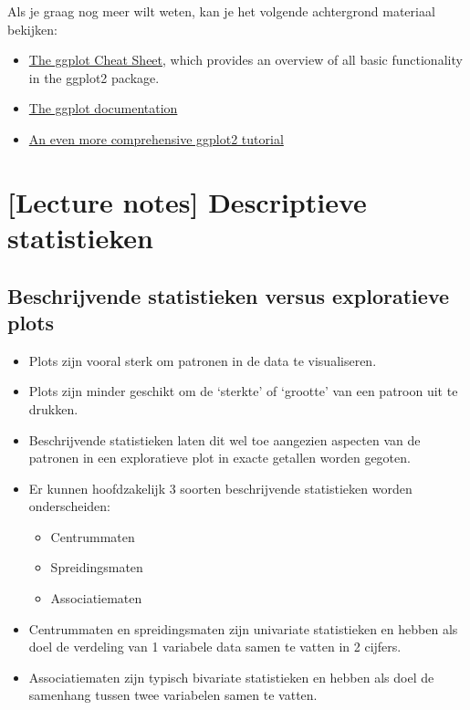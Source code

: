 \documentclass[]{tufte-book}
\providecommand{\tightlist}{%
  \setlength{\itemsep}{0pt}\setlength{\parskip}{0pt}}
\begin{document}
Als je graag nog meer wilt weten, kan je het volgende achtergrond materiaal bekijken:

\begin{itemize}
\tightlist
\item
  \href{https://www.rstudio.com/wp-content/uploads/2015/03/ggplot2-cheatsheet.pdf}{The ggplot Cheat Sheet}, which provides an overview of all basic functionality in the ggplot2 package.
\item
  \href{http://docs.ggplot2.org/current/}{The ggplot documentation}
\item
  \href{http://tutorials.iq.harvard.edu/R/Rgraphics/Rgraphics.html}{An even more comprehensive ggplot2 tutorial}
\end{itemize}

\hypertarget{lecture-notes-descriptieve-statistieken}{%
\chapter{{[}Lecture notes{]} Descriptieve statistieken}\label{lecture-notes-descriptieve-statistieken}}

\hypertarget{beschrijvende-statistieken-versus-exploratieve-plots}{%
\section{Beschrijvende statistieken versus exploratieve plots}\label{beschrijvende-statistieken-versus-exploratieve-plots}}

\begin{itemize}
\tightlist
\item
  Plots zijn vooral sterk om patronen in de data te visualiseren.
\item
  Plots zijn minder geschikt om de `sterkte' of `grootte' van een patroon uit te drukken.
\item
  Beschrijvende statistieken laten dit wel toe aangezien aspecten van de patronen in een exploratieve plot in exacte getallen worden gegoten.
\item
  Er kunnen hoofdzakelijk 3 soorten beschrijvende statistieken worden onderscheiden:

  \begin{itemize}
  \tightlist
  \item
    Centrummaten
  \item
    Spreidingsmaten
  \item
    Associatiematen
  \end{itemize}
\item
  Centrummaten en spreidingsmaten zijn univariate statistieken en hebben als doel de verdeling van 1 variabele data samen te vatten in 2 cijfers.
\item
  Associatiematen zijn typisch bivariate statistieken en hebben als doel de samenhang tussen twee variabelen samen te vatten.
\end{itemize}
\end{document}
